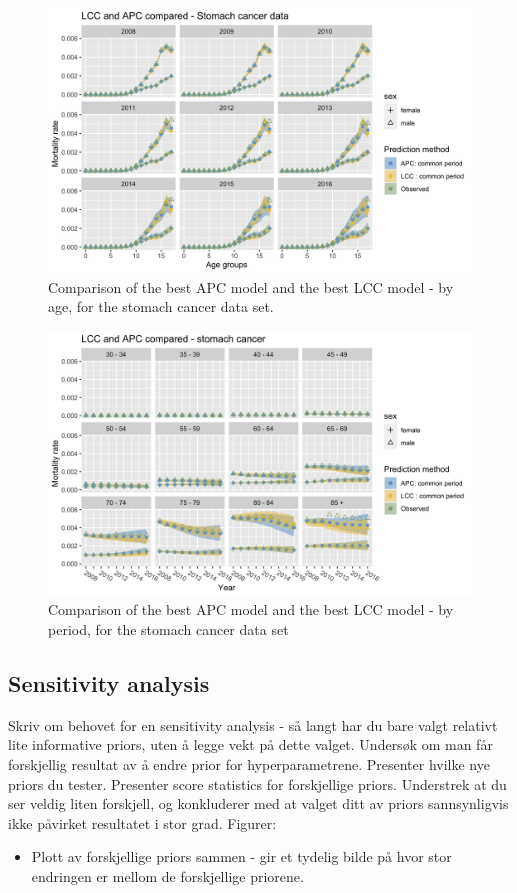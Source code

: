 \begin{figure}[h!]
    \centering
    \includegraphics[width = .8\linewidth]{real-data/real-data-multivariate/Figures/multivariate-comparison-by-age-stomach.png}
    \caption{Comparison of the best APC model and the best LCC model - by age, for the stomach cancer data set. }
    \label{fig:mv-LCC-by-period-stomach}
\end{figure}

\begin{figure}[h!]
    \centering
    \includegraphics[width = .8\linewidth]{real-data/real-data-multivariate/Figures/multivariate-comparison-by-period-stomach.png}
    \caption{Comparison of the best APC model and the best LCC model - by period, for the stomach cancer data set}
    \label{fig:mv-APC-by-period-stomach}
\end{figure}

\newpage
\subsection{Sensitivity analysis}
\textcolor{myDarkGreen}{Skriv om behovet for en sensitivity analysis - så langt har du bare valgt relativt lite informative priors, uten å legge vekt på dette valget. Undersøk om man får forskjellig resultat av å endre prior for hyperparametrene. Presenter hvilke nye priors du tester. Presenter score statistics for forskjellige priors. 
Understrek at du ser veldig liten forskjell, og konkluderer med at valget ditt av priors sannsynligvis ikke påvirket resultatet i stor grad. 
\newline
Figurer:
\begin{itemize}
    \item Plott av forskjellige priors sammen - gir et tydelig bilde på hvor stor endringen er mellom de forskjellige priorene. 
\end{itemize}}

